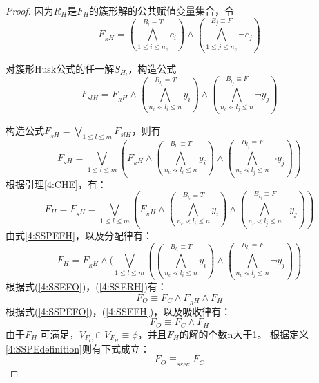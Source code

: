 \begin{proof}
因为${R_H}$是$F_H$的簇形解的公共赋值变量集合，令
\begin{equation}\label{4:SSERH}
F_{_RH}=
(\bigwedge_{1\leqslant i\leqslant n_c}^{B_i\equiv T} c_i)\wedge
(\bigwedge_{1\leqslant j\leqslant n_c}^{B_j\equiv F}\neg c_j)
\end{equation}

对簇形Husk公式的任一解$S_{H_l}$，构造公式
\begin{equation}\label{4:SSPERH}
F_{slH}=F_{_RH}\wedge
(\bigwedge_{n_c\lessdot l_i\leqslant n}^{B_{l_i}\equiv T} y_i)\wedge
(\bigwedge_{n_c\lessdot l_j\leqslant n}^{B_{l_j}\equiv F}\neg y_j)
\end{equation}

构造公式$F_{_SH}=\bigvee_{1\leqslant l\leqslant m}F_{slH}$，则有
\begin{equation}
F_{_SH}=\bigvee_{1\leqslant l\leqslant m}(F_{_RH}\wedge
(\bigwedge_{n_c\lessdot l_i\leqslant n}^{B_{l_i}\equiv T} y_i)\wedge
(\bigwedge_{n_c\lessdot l_j\leqslant n}^{B_{l_j}\equiv F}\neg y_j))
\end{equation}
根据引理\ref{4:CHE}，有：
\begin{equation}\label{4:SSPEFH}
F_H=F_{_SH}=\bigvee_{1\leqslant l\leqslant m}(F_{_RH}\wedge
(\bigwedge_{n_c\lessdot l_i\leqslant n}^{B_{l_i}\equiv T} y_i)\wedge
(\bigwedge_{n_c\lessdot l_j\leqslant n}^{B_{l_j}\equiv F}\neg y_j))
\end{equation}
由式\ref{4:SSPEFH}，以及分配律有：
\begin{equation}\label{4:SSEFH}
F_H=F_{_RH}\wedge (\bigvee_{1\leqslant l\leqslant m}(
(\bigwedge_{n_c\lessdot l_i\leqslant n}^{B_{l_i}\equiv T} y_i)\wedge
(\bigwedge_{n_c\lessdot l_j\leqslant n}^{B_{l_j}\equiv F}\neg y_j))
\end{equation}
根据式(\ref{4:SSEFO})，(\ref{4:SSERH})有：
\begin{equation}\label{4:SSPEFO}
F_O\equiv F_C \wedge F_{_RH}\wedge F_H
\end{equation}
根据式(\ref{4:SSPEFO})，(\ref{4:SSEFH})，以及吸收律有：
\begin{equation}\label{4:SSEEND}
F_O\equiv F_C \wedge F_H
\end{equation}
由于$F_H$ 可满足，$V_{F_C}\cap V_{F_H}\equiv \phi$，并且$F_H$的解的个数n大于1。
根据定义\ref{4:SSPEdefinition}则有下式成立：
\begin{equation}
F_O\equiv_{_{SSPE}}  F_C
\end{equation}
\end{proof}

